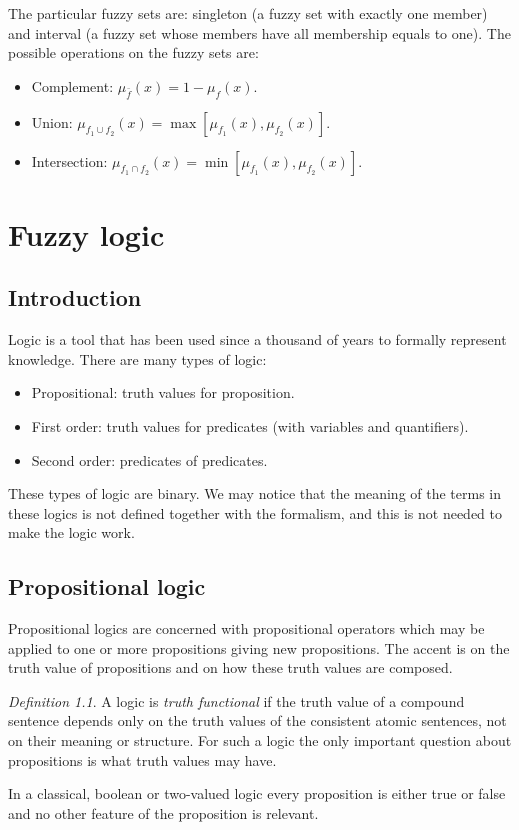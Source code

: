 \documentclass[12pt, a4paper]{report}
\theoremstyle{remark}
\newtheorem*{remark}{Definition}
\begin{document}
    The particular fuzzy sets are: singleton (a fuzzy set with exactly one member) and interval (a fuzzy set whose members have all membership
    equals to one). The possible operations on the fuzzy sets are: 
    \begin{itemize}
        \item Complement: $\mu_{\bar{f}}(x)=1-\mu_f(x)$.
        \item Union: $\mu_{f_1 \cup f_2}(x)=\max [\mu_{f_1}(x),\mu_{f_2}(x)]$.
        \item Intersection: $\mu_{f_1 \cap f_2}(x)=\min [\mu_{f_1}(x),\mu_{f_2}(x)]$.
    \end{itemize}

    \newpage

    \chapter{Fuzzy logic}
    \section{Introduction}
    Logic is a tool that has been used since a thousand of years to formally represent knowledge. There are many types of logic: 
    \begin{itemize}
        \item Propositional: truth values for proposition.
        \item First order: truth values for predicates (with variables and quantifiers).
        \item Second order: predicates of predicates.
    \end{itemize}
    These types of logic are binary. We may notice that the meaning of the terms in these logics is not defined together with the formalism,
    and this is not needed to make the logic work.

    \section{Propositional logic}
    Propositional logics are concerned with propositional operators which may be applied to one or more propositions giving new propositions.
    The accent is on the truth value of propositions and on how these truth values are composed.
    \begin{remark}
        A logic is \emph{truth functional} if the truth value of a compound sentence depends only on the truth values of the consistent atomic 
        sentences, not on their meaning or structure. For such a logic the only important question about propositions is what truth values may
        have.
    \end{remark}
    In a classical, boolean or two-valued logic every proposition is either true or false and no other feature of the proposition is relevant.
\end{document}
